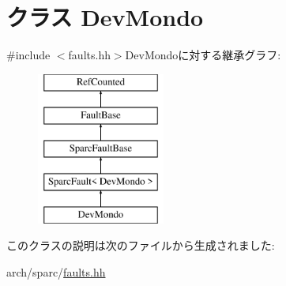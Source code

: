 \hypertarget{classSparcISA_1_1DevMondo}{
\section{クラス DevMondo}
\label{classSparcISA_1_1DevMondo}
}


{\ttfamily \#include $<$faults.hh$>$}DevMondoに対する継承グラフ:\begin{figure}[H]
\begin{center}
\leavevmode
\includegraphics[height=5cm]{classSparcISA_1_1DevMondo}
\end{center}
\end{figure}


このクラスの説明は次のファイルから生成されました:\begin{DoxyCompactItemize}
\item 
arch/sparc/\hyperlink{arch_2sparc_2faults_8hh}{faults.hh}\end{DoxyCompactItemize}

